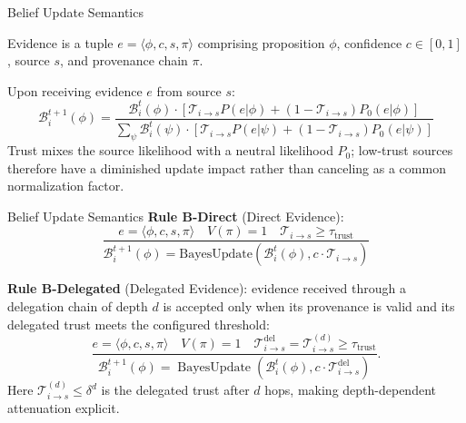 \documentclass[
  ignorenonframetext,
]{beamer}
\begin{document}
\begin{frame}[allowframebreaks]{Belief Update Semantics}
\protect{}\label{sec:belief-update-rules}
\begin{definition}
\label{def:evidence}
Evidence is a tuple $e = \langle \phi, c, s, \pi \rangle$ comprising proposition $\phi$, confidence $c \in [0,1]$, source $s$, and provenance chain $\pi$.
\end{definition}

\begin{definition}
\label{def:bayesian-update}
Upon receiving evidence $e$ from source $s$:
\begin{equation}
\label{eq:bayesian-update}
\mathcal{B}_i^{t+1}(\phi) = \frac{\mathcal{B}_i^t(\phi) \cdot \left[\mathcal{T}_{i \to s} P(e|\phi) + (1-\mathcal{T}_{i \to s})P_0(e|\phi)\right]}{\sum_{\psi} \mathcal{B}_i^t(\psi) \cdot \left[\mathcal{T}_{i \to s} P(e|\psi) + (1-\mathcal{T}_{i \to s})P_0(e|\psi)\right]}
\end{equation}
Trust mixes the source likelihood with a neutral likelihood $P_0$; low-trust sources therefore have a diminished update impact rather than canceling as a common normalization factor.
\end{definition}

\end{frame}

\begin{frame}[allowframebreaks]{Belief Update Semantics}
\textbf{Rule B-Direct} (Direct Evidence): \begin{equation}
\label{eq:rule-direct}
\frac{e = \langle \phi, c, s, \pi \rangle \quad V(\pi) = 1 \quad \mathcal{T}_{i \to s} \geq \tau_{\text{trust}}}{\mathcal{B}_i^{t+1}(\phi) = \text{BayesUpdate}(\mathcal{B}_i^t(\phi), c \cdot \mathcal{T}_{i \to s})}
\end{equation}

\textbf{Rule B-Delegated} (Delegated Evidence): evidence received
through a delegation chain of depth \(d\) is accepted only when its
provenance is valid and its delegated trust meets the configured
threshold: \begin{equation}
\label{eq:rule-delegated}
\frac{e = \langle \phi, c, s, \pi \rangle \quad V(\pi) = 1 \quad
\mathcal{T}^{\mathrm{del}}_{i \to s} = \mathcal{T}^{(d)}_{i \to s} \geq \tau_{\text{trust}}}
{\mathcal{B}_i^{t+1}(\phi) = \operatorname{BayesUpdate}
\left(\mathcal{B}_i^t(\phi), c \cdot \mathcal{T}^{\mathrm{del}}_{i \to s}\right)}.
\end{equation} Here \(\mathcal{T}^{(d)}_{i \to s} \leq \delta^d\) is the
delegated trust after \(d\) hops, making depth-dependent attenuation
explicit.

\end{frame}
\end{document}
